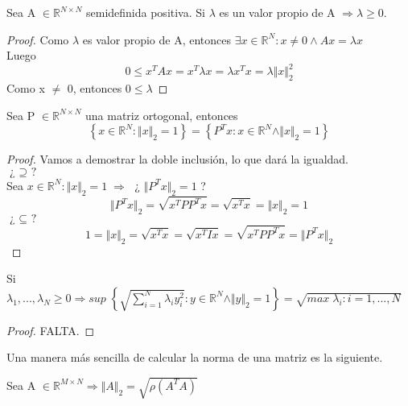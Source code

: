 \begin{nprop}
Sea A $\in \mathbb{R}^{N \times N}$ semidefinida positiva. Si $\lambda$ es un valor propio de A $\Rightarrow \lambda \geq 0$.
\end{nprop}

\begin{proof}
Como $\lambda$ es valor propio de A, entonces $ \exists x \in \mathbb{R}^N : x \neq 0 \wedge Ax = \lambda x$\\
Luego\\
\[ 0 \leq x^TAx = x^T \lambda x = \lambda x^Tx = \lambda \Vert x \Vert _2^2 \]
Como x $\neq$ 0, entonces $ 0 \leq \lambda$
\end{proof}

\begin{nprop}
Sea P $\in \mathbb{R}^{N \times N}$ una matriz ortogonal, entonces
\[ \left\lbrace x \in \mathbb{R}^N : \Vert x \Vert _2 = 1 \right\rbrace = \left\lbrace P^Tx : x \in \mathbb{R}^N \wedge \Vert x \Vert _2 = 1 \right\rbrace \]
\end{nprop}

\begin{proof}
Vamos a demostrar la doble inclusión, lo que dará la igualdad.\\
$\textbf{¿ $\supseteq$ ?}$\\
Sea $x \in \mathbb{R}^N : \Vert x \Vert _2 = 1 \; \Rightarrow \;$ ¿ $\Vert P^Tx \Vert _2 = 1 $ ?
\[ \Vert P^Tx \Vert _2 = \sqrt{x^TPP^Tx} = \sqrt{x^Tx} = \Vert x \Vert _2 = 1 \]
$\textbf{¿ $\subseteq$ ?}$\\
\[ 1 = \Vert x \Vert _2 = \sqrt{x^Tx} = \sqrt{x^TIx} = \sqrt{x^TPP^Tx} = \Vert P^Tx \Vert _2 \]
\end{proof}

\begin{nprop}
Si $\lambda _1,..., \lambda _N \geq 0 \Rightarrow sup \; \left\lbrace \sqrt{\sum_{i=1}^N \lambda _iy_i^2} : y \in \mathbb{R}^N \wedge \Vert y \Vert _2 = 1 \right\rbrace = \sqrt{max \; \lambda _i : i = 1,...,N} $
\end{nprop}

\begin{proof}
FALTA.
\end{proof}

Una manera más sencilla de calcular la norma de una matriz es la siguiente.

\begin{nprop}
Sea A $\in \mathbb{R}^{M \times N} \Rightarrow \Vert A \Vert _2 = \sqrt{\rho (A^TA)} $
\end{nprop}

